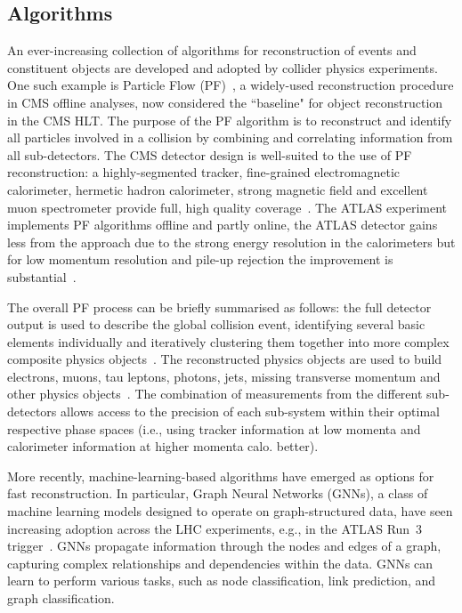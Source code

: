 \subsection{Algorithms} \label{sec:Algorithms}

An ever-increasing collection of algorithms for reconstruction of events and constituent objects are developed and adopted by collider physics experiments. One such example is Particle Flow (PF)~\cite{sirunyan2017pflowcms}, a widely-used reconstruction procedure in CMS offline analyses, now considered the ``baseline" for object reconstruction in the CMS HLT. The purpose of the PF algorithm is to reconstruct and identify all particles involved in a collision by combining and correlating information from all sub-detectors. The CMS detector design is well-suited to the use of PF reconstruction: a highly-segmented tracker, fine-grained electromagnetic calorimeter, hermetic hadron calorimeter, strong magnetic field and excellent muon spectrometer provide full, high quality coverage~\cite{sirunyan2017pflowcms}. The ATLAS experiment implements PF algorithms offline and partly online, the ATLAS detector gains less from the approach due to the strong energy resolution in the calorimeters but for low momentum resolution and pile-up rejection the improvement is substantial~\cite{ATLASTriggerRun3,ATLASJetPFlow}.

The overall PF process can be briefly summarised as follows: the full detector output is used to describe the global collision event, identifying several basic elements individually and iteratively clustering them together into more complex composite physics objects~\cite{CMS:2020uim,CMS:2018rym,CMS:2014pgm}. The reconstructed physics objects are used to build electrons, muons, tau leptons, photons, jets, missing transverse momentum and other physics objects~\cite{CMS:2018jrd,CMS:2016lmd,CMS:2019ctu}. The combination of measurements from the different sub-detectors allows access to the precision of each sub-system within their optimal respective phase spaces (i.e.,  using tracker information at low momenta and calorimeter information at higher momenta calo. better).


More recently, machine-learning-based algorithms have emerged as options for fast reconstruction. In particular, Graph Neural Networks (GNNs), a class of machine learning models designed to operate on graph-structured data, have seen increasing adoption across the LHC experiments, e.g.,  in the ATLAS Run~3 trigger~\cite{que2023llgnn}. GNNs propagate information through the nodes and edges of a graph, capturing complex relationships and dependencies within the data. GNNs can learn to perform various tasks, such as node classification, link prediction, and graph classification.


